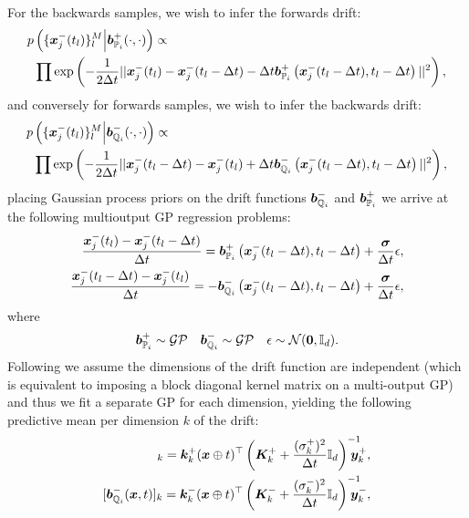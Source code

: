 \documentclass[a4paper,12pt,twoside,openright]{report}
\theoremstyle{definition}
\begin{document}
For the backwards samples, we wish to infer the forwards drift:
\begin{align*}
    p&\left(\{{\bm{x}}^{-}_j(t_l)\}_{l}^M \Big| {\bm{b}}^{+}_{{\mathbb{P}}_{i}}(\cdot, \cdot)\right) \propto\\
    &\prod \exp \left( -\frac{1}{2\Delta t} ||{\bm{x}}^{-}_j(t_l) - {\bm{x}}^{-}_j(t_l - \Delta t) -  \Delta t{\bm{b}}^{+}_{{\mathbb{P}}_{i}}\left({\bm{x}}^{-}_j(t_l - \Delta t), t_l - \Delta t\right) ||^2 \right), 
\end{align*}
and conversely for forwards samples, we wish to infer the backwards drift:
\begin{align*}
    p&\left(\{{\bm{x}}^{-}_j(t_l)\}_{l}^M \Big| {\bm{b}}^{-}_{{\mathbb{Q}}_{i}}(\cdot, \cdot)\right) \propto\\
    &\prod \exp \left( -\frac{1}{2\Delta t} ||{\bm{x}}^{-}_j(t_l - \Delta t)  - {\bm{x}}^{-}_j(t_l)  +  \Delta t{\bm{b}}^{-}_{{\mathbb{Q}}_{i}}\left({\bm{x}}^{-}_j(t_l - \Delta t), t_l - \Delta t\right) ||^2 \right), 
\end{align*}
placing Gaussian process priors on the drift functions ${\bm{b}}^{-}_{{\mathbb{Q}}_{i}}$ and ${\bm{b}}^{+}_{{\mathbb{P}}_{i}}$ we arrive at the following multioutput GP regression problems:
\begin{align*}
        \frac{{\bm{x}}^{-}_j(t_l) - {\bm{x}}^{-}_j(t_l - \Delta t)}{\Delta t} = {\bm{b}}^{+}_{{\mathbb{P}}_{i}}\left({\bm{x}}^{-}_j(t_l - \Delta t), t_l - \Delta t\right) +\frac{\bm{\sigma}}{\Delta t}\epsilon ,\\
        \frac{{\bm{x}}^{-}_j(t_l - \Delta t)  - {\bm{x}}^{-}_j(t_l)}{\Delta t}  = -{\bm{b}}^{-}_{{\mathbb{Q}}_{i}}\left({\bm{x}}^{-}_j(t_l - \Delta t), t_l - \Delta t\right) +\frac{\bm{\sigma}}{\Delta t}\epsilon,
\end{align*}
where
\begin{align}
   {\bm{b}}^{+}_{{\mathbb{P}}_{i}} \sim \mathcal{GP} \quad {\bm{b}}^{-}_{{\mathbb{Q}}_{i}} \sim \mathcal{GP}\quad \epsilon \sim {\mathcal{N}}({\bm{0}}, {\mathbb{I}_d}).
\end{align}
Following \cite{ruttor2013approximate} we assume the dimensions of the drift function are independent (which is equivalent to imposing a block diagonal kernel matrix on a multi-output GP) and thus we fit a separate GP for each dimension, yielding the following predictive mean per dimension $k$ of the drift:
\begin{align}
[\bar{\vb}^{+}_{\P_{i}}(\vx, t)]_k = \vk_k^{+}(\vx \oplus t)^{\top} \left(\mK_k^{+} + \frac{(\sigma_k^{+})^2}{\Delta t} \I\right)^{-1}\!\!\!\!\!\!\vy_k^{+}, \\
[\vb^{-}_{\Q_{i}}(\vx, t)]_k = \vk_k^{-}(\vx \oplus t)^{\top} \left(\mK_k^{-} + \frac{(\sigma_k^{-})^2}{\Delta t} \I\right)^{-1}\!\!\!\!\!\!\vy_k^{-} ,
\end{align}
\end{document}
